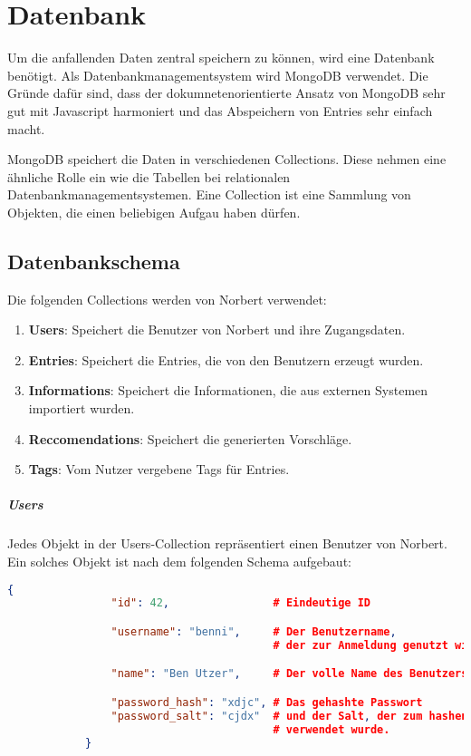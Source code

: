 
\chapter{Datenbank}

Um die anfallenden Daten zentral speichern zu können, wird eine Datenbank benötigt. Als Datenbankmanagementsystem wird MongoDB verwendet. Die Gründe dafür sind, dass der dokumnetenorientierte Ansatz von MongoDB sehr gut mit Javascript harmoniert und das Abspeichern von Entries sehr einfach macht.

MongoDB speichert die Daten in verschiedenen Collections. Diese nehmen eine ähnliche Rolle ein wie die Tabellen bei relationalen Datenbankmanagementsystemen. Eine Collection ist eine Sammlung von Objekten, die einen beliebigen Aufgau haben dürfen.

\section{Datenbankschema} %
\label{sec:datenbankschema}

	Die folgenden Collections werden von Norbert verwendet:

	\begin{enumerate}
		\item \textbf{Users}: Speichert die Benutzer von Norbert und ihre Zugangsdaten.
		\item \textbf{Entries}: Speichert die Entries, die von den Benutzern erzeugt wurden.
		\item \textbf{Informations}: Speichert die Informationen, die aus externen Systemen importiert wurden.
		\item \textbf{Reccomendations}: Speichert die generierten Vorschläge.
		\item \textbf{Tags}: Vom Nutzer vergebene Tags für Entries.
	\end{enumerate}

	\paragraph{Users} %
	\label{par:users}

		Jedes Objekt in der Users-Collection repräsentiert einen Benutzer von Norbert. Ein solches Objekt ist nach dem folgenden Schema aufgebaut:

		\begin{lstlisting}[language=JSON]
			{
				"id": 42,                # Eindeutige ID

				"username": "benni",     # Der Benutzername, 
				                         # der zur Anmeldung genutzt wird.

				"name": "Ben Utzer",     # Der volle Name des Benutzers

				"password_hash": "xdjc", # Das gehashte Passwort
				"password_salt": "cjdx"  # und der Salt, der zum hashen des Passworts 
				                         # verwendet wurde.
			}
		\end{lstlisting}
